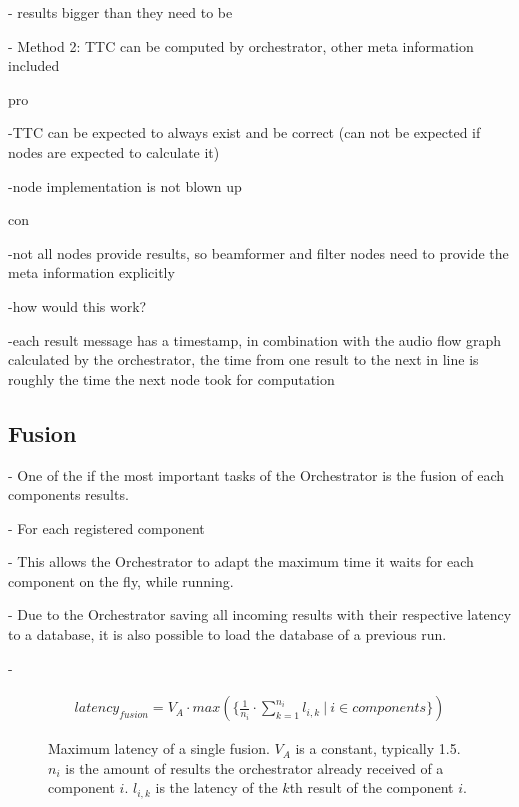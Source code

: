 - results bigger than they need to be

- Method 2: TTC can be computed by orchestrator, other meta information included 

pro

-TTC can be expected to always exist and be correct (can not be expected if nodes are expected to calculate it)

-node implementation is not blown up

con

-not all nodes provide results, so beamformer and filter nodes need to provide the meta information explicitly

-how would this work?

-each result message has a timestamp, in combination with the audio flow graph calculated by the orchestrator, the time from one result to the next in line is roughly the time the next node took for computation


\subsection{Fusion}
- One of the if the most important tasks of the Orchestrator is the fusion of each components results.

- For each registered component

- This allows the Orchestrator to adapt the maximum time it waits for each component on the fly, while running.

- Due to the Orchestrator saving all incoming results with their respective latency to a database, it is also possible to load the database of a previous run.

- 


\begin{figure}
	\begin{align}
	latency_{fusion} = V_A \cdot max(\{\frac{1}{n_i} \cdot \sum_{k=1}^{n_i} l_{i,k}\ | \ i \in components\})
	\end{align}
	\caption{Maximum latency of a single fusion.
		$V_A$ is a constant, typically 1.5.
		$n_i$ is the amount of results the orchestrator already received of a component $i$.
		$l_{i,k}$ is the latency of the $k$th result of the component $i$.}
	\label{main:orc:latency:formula}
\end{figure}